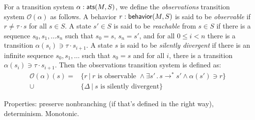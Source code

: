 {\begin{definition}
For a transition system $\alpha :  \mathsf{ats} (M, S)$,
we define the \emph{observations} transition system
$\mathcal{O}(\alpha)$ as follows.
A behavior $r :  \mathsf{behavior} (M, S)$ is said to be
\emph{observable} if $r \ne \tau \cdot s$ for all $s \in S$.
A state $s' \in S$ is said to be \emph{reachable} from $s \in S$
if there is a sequence $s_0, s_1, \ldots s_n$ such that
$s_0 = s$, $s_n = s'$,
and for all $0 \le i < n$
there is a transition $\alpha(s_i) \ni \tau \cdot s_{i+1}$.
A state $s$ is said to be \emph{silently divergent}
if there is an infinite sequence $s_0, s_1, \ldots$
such that $s_0 = s$ and for all $i$,
there is a transition $\alpha(s_i) \ni \tau \cdot s_{i+1}$.
Then the observations transition system is defined as:
\begin{align*}
    \mathcal{O}(\alpha)(s) = &\{ r \:|\: r \mbox{ is observable } \wedge
         \exists s' \,.\, s \rightarrow^* s' \wedge
		\alpha(s') \ni r \} \\
      \cup &\{ \Delta \:|\: s \mbox{ is silently divergent} \}
\end{align*}
\end{definition}

Properties:
preserve nonbranching (if that's defined in the right way), determinism.
Monotonic.

}
